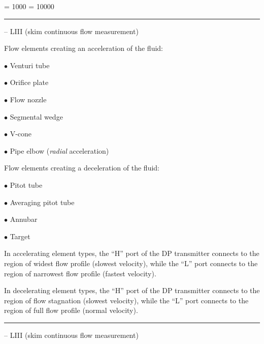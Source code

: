 



\tolerance = 1000
\pretolerance = 10000

\vskip 5pt \hrule \vskip 5pt  -- LIII (skim continuous flow measurement) \vskip 10pt

Flow elements creating an acceleration of the fluid:

\medskip
\item{$\bullet$} Venturi tube
\item{$\bullet$} Orifice plate
\item{$\bullet$} Flow nozzle
\item{$\bullet$} Segmental wedge
\item{$\bullet$} V-cone
\item{$\bullet$} Pipe elbow ({\it radial} acceleration)
\medskip

\vskip 10pt

Flow elements creating a deceleration of the fluid:

\medskip
\item{$\bullet$} Pitot tube
\item{$\bullet$} Averaging pitot tube
\item{$\bullet$} Annubar
\item{$\bullet$} Target
\medskip

\vskip 10pt

In accelerating element types, the ``H'' port of the DP transmitter connects to the region of widest flow profile (slowest velocity), while the ``L'' port connects to the region of narrowest flow profile (fastest velocity).

\vskip 10pt

In decelerating element types, the ``H'' port of the DP transmitter connects to the region of flow stagnation (slowest velocity), while the ``L'' port connects to the region of full flow profile (normal velocity).



\vskip 5pt \hrule \vskip 5pt  -- LIII (skim continuous flow measurement) \vskip 10pt

